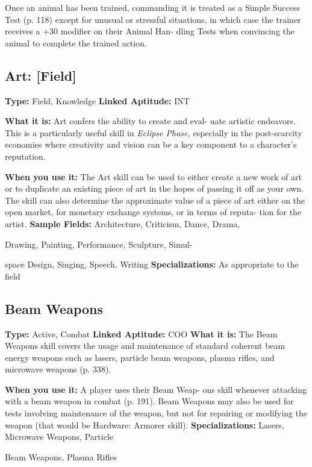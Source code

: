 Once an animal has been trained, commanding 
it is treated as a Simple Success Test (p. 118) except 
for unusual or stressful situations, in which case the 
trainer receives a +30 modifier on their Animal Han-
dling Tests when convincing the animal to complete 
the trained action.

\subsection{Art: [Field]}

\textbf{Type: }Field, Knowledge
\textbf{Linked Aptitude:} INT

\textbf{What it is:} Art confers the ability to create and eval-
uate artistic endeavors. This is a particularly useful 
skill in \textit{Eclipse Phase,} especially in the post-scarcity 
economies where creativity and vision can be a key 
component to a character's reputation.

\textbf{When you use it:} The Art skill can be used to either 
create a new work of art or to duplicate an existing 
piece of art in the hopes of passing it off as your 
own. The skill can also determine the approximate 
value of a piece of art either on the open market, for 
monetary exchange systems, or in terms of reputa-
tion for the artist.
\textbf{Sample Fields:} Architecture, Criticism, Dance, Drama, 

Drawing, Painting, Performance, Sculpture, Simul-

space Design, Singing, Speech, Writing
\textbf{Specializations:} As appropriate to the field

\subsection{Beam Weapons}

\textbf{Type:} Active, Combat
\textbf{Linked Aptitude:} COO
\textbf{What it is:} The Beam Weapons skill covers the usage 
and maintenance of standard coherent beam energy 
weapons such as lasers, particle beam weapons, 
plasma rifles, and microwave weapons (p. 338).

\textbf{When you use it:} A player uses their Beam Weap-
ons skill whenever attacking with a beam weapon in 
combat (p. 191). Beam Weapons may also be used for 
tests involving maintenance of the weapon, but not 
for repairing or modifying the weapon (that would be 
Hardware: Armorer skill).
\textbf{Specializations:} Lasers, Microwave Weapons, Particle 

Beam Weapons, Plasma Rifles

